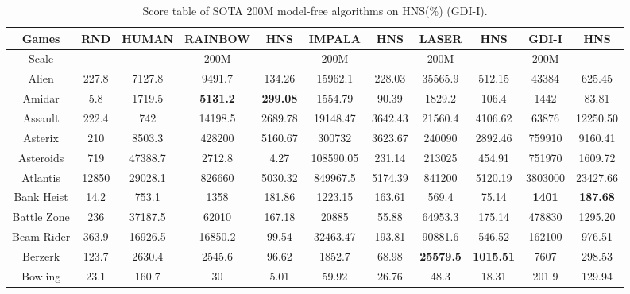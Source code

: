 \documentclass[nohyperref]{article}
\newcommand{\best}[1]{\textbf{#1}}
\theoremstyle{plain}
\begin{document}
\begin{table}[!hb]
\footnotesize
\begin{center}
\caption{Score table of SOTA 200M model-free algorithms on HNS(\%) (GDI-I).}
\setlength{\tabcolsep}{1.0pt}
\begin{tabular}{ |c| c| c| c c| c c| c c| c c| }
\hline
Games & RND & HUMAN & RAINBOW & HNS & IMPALA & HNS & LASER & HNS & GDI-I & HNS \\
\hline
Scale  &     &       & 200M   &       &  200M    &        & 200M   &         &  200M   &  \\
\hline
 Alien  & 227.8 & 7127.8            & 9491.7 & 134.26 & 15962.1  & 228.03 & 35565.9 & 512.15                        &43384             &625.45             \\
 Amidar & 5.8   & 1719.5            & \textbf{5131.2} & \textbf{299.08} & 1554.79  & 90.39  & 1829.2  & 106.4       &1442              &83.81                \\
 Assault & 222.4 & 742              & 14198.5 & 2689.78 & 19148.47 & 3642.43  & 21560.4 & 4106.62                   &63876             &12250.50          \\
 Asterix & 210   & 8503.3           & 428200 & 5160.67 & 300732   & 3623.67  & 240090  & 2892.46                    &759910            &9160.41            \\
 Asteroids & 719 & 47388.7          & 2712.8 & 4.27   & 108590.05 & 231.14  & 213025  &  454.91                     &751970            &1609.72          \\
 Atlantis & 12850 & 29028.1         & 826660 & 5030.32 & 849967.5 & 5174.39 & 841200 & 5120.19                      &3803000           &23427.66          \\
 Bank Heist & 14.2 & 753.1          & 1358   & 181.86  & 1223.15  & 163.61  & 569.4  & 75.14                        &\best{1401}       &\best{187.68}       \\
 Battle Zone & 236 & 37187.5        & 62010 & 167.18  & 20885    & 55.88  & 64953.3 & 175.14                        &478830            &1295.20            \\
 Beam Rider & 363.9 & 16926.5       & 16850.2 & 99.54 & 32463.47 & 193.81 & 90881.6 & 546.52                        &162100            &976.51             \\
 Berzerk & 123.7 & 2630.4           & 2545.6   & 96.62  & 1852.7   & 68.98  & \textbf{25579.5} & \textbf{1015.51}   &7607              &298.53              \\
 Bowling & 23.1 & 160.7             & 30   & 5.01        & 59.92    & 26.76  & 48.3    & 18.31                      &201.9             &129.94              \\

\end{tabular}
\end{center}
\end{table}
\end{document}
